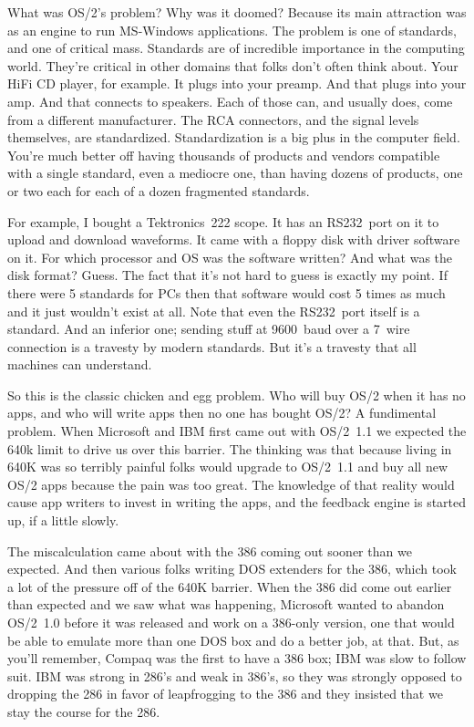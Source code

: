 What was OS/2's problem?  Why was it doomed?  Because its main attraction
was as an engine to run MS-Windows applications.  The problem is one of
standards, and one of critical mass.  Standards are of incredible importance
in the computing world.  They're critical in other domains that folks
don't often think about.  Your HiFi CD player, for example.  It plugs into
your preamp.  And that plugs into your amp.  And that connects to speakers.
Each of those can, and usually does, come from a different manufacturer.
The RCA connectors, and the signal levels themselves, are standardized.
Standardization is a big plus in the computer field.  You're much better off
having thousands of products and vendors compatible with a single standard,
even a mediocre one, than having dozens of products, one or two each for
each of a dozen fragmented standards.

For example, I bought a Tektronics~222 scope.  It has an RS232~port on
it to upload and download waveforms.  It came with a floppy disk with
driver software on it.  For which processor and OS was the software written?
And what was the disk format?  Guess.  The fact that it's not hard to
guess is exactly my point.  If there were 5 standards for PCs then
that software would cost 5 times as much and it just wouldn't exist at all.  
Note that even the RS232~port
itself is a standard.  And an inferior one; sending stuff at 9600~baud
over a 7~wire connection is a travesty by modern standards.  But it's
a travesty that all machines can understand.

So this is the classic chicken and egg problem.  Who will buy OS/2 when
it has no apps, and who will write apps then no one has bought OS/2?
A fundimental problem.  When Microsoft and IBM first came out with OS/2~1.1
we expected the 640k limit to drive us over this barrier.  The thinking
was that because living in 640K was so terribly painful folks would
upgrade to OS/2~1.1 and buy all new OS/2 apps because the pain was too
great.  The knowledge of that reality would cause app writers to
invest in writing the apps, and the feedback engine is started up, if
a little slowly.  

The miscalculation came about with the 386 coming out sooner than we
expected.  And then various folks writing DOS extenders for the 386,
which took a lot of the pressure off of the 640K barrier.  When the
386 did come out earlier than expected and we saw what was happening, 
Microsoft wanted to abandon
OS/2~1.0 before it was released and work on a 386-only version, one that
would be able to emulate more than one DOS box and do a better job, at that.
But, as you'll remember, Compaq was the first to have a 386 box; IBM
was slow to follow suit.  IBM was strong in 286's and weak in 386's,
so they was strongly opposed to dropping the 286
in favor of leapfrogging to the 386 and they insisted that we stay the course
for the 286.  

